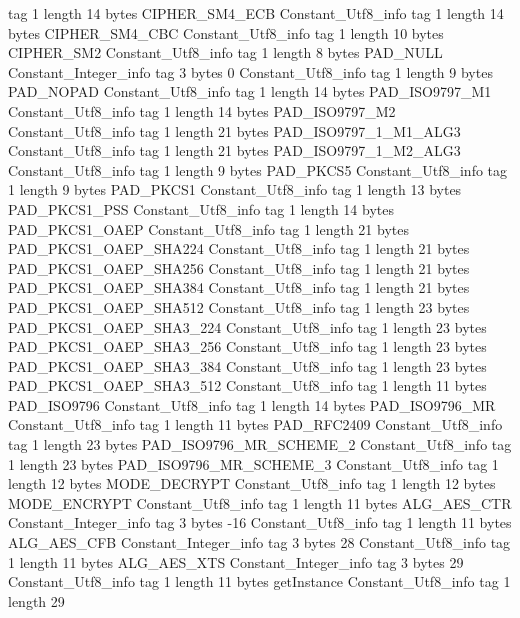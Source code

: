 {{{			tag	1
			length	14
			bytes	CIPHER_SM4_ECB
		}
		Constant_Utf8_info {
			tag	1
			length	14
			bytes	CIPHER_SM4_CBC
		}
		Constant_Utf8_info {
			tag	1
			length	10
			bytes	CIPHER_SM2
		}
		Constant_Utf8_info {
			tag	1
			length	8
			bytes	PAD_NULL
		}
		Constant_Integer_info {
			tag	3
			bytes	0
		}
		Constant_Utf8_info {
			tag	1
			length	9
			bytes	PAD_NOPAD
		}
		Constant_Utf8_info {
			tag	1
			length	14
			bytes	PAD_ISO9797_M1
		}
		Constant_Utf8_info {
			tag	1
			length	14
			bytes	PAD_ISO9797_M2
		}
		Constant_Utf8_info {
			tag	1
			length	21
			bytes	PAD_ISO9797_1_M1_ALG3
		}
		Constant_Utf8_info {
			tag	1
			length	21
			bytes	PAD_ISO9797_1_M2_ALG3
		}
		Constant_Utf8_info {
			tag	1
			length	9
			bytes	PAD_PKCS5
		}
		Constant_Utf8_info {
			tag	1
			length	9
			bytes	PAD_PKCS1
		}
		Constant_Utf8_info {
			tag	1
			length	13
			bytes	PAD_PKCS1_PSS
		}
		Constant_Utf8_info {
			tag	1
			length	14
			bytes	PAD_PKCS1_OAEP
		}
		Constant_Utf8_info {
			tag	1
			length	21
			bytes	PAD_PKCS1_OAEP_SHA224
		}
		Constant_Utf8_info {
			tag	1
			length	21
			bytes	PAD_PKCS1_OAEP_SHA256
		}
		Constant_Utf8_info {
			tag	1
			length	21
			bytes	PAD_PKCS1_OAEP_SHA384
		}
		Constant_Utf8_info {
			tag	1
			length	21
			bytes	PAD_PKCS1_OAEP_SHA512
		}
		Constant_Utf8_info {
			tag	1
			length	23
			bytes	PAD_PKCS1_OAEP_SHA3_224
		}
		Constant_Utf8_info {
			tag	1
			length	23
			bytes	PAD_PKCS1_OAEP_SHA3_256
		}
		Constant_Utf8_info {
			tag	1
			length	23
			bytes	PAD_PKCS1_OAEP_SHA3_384
		}
		Constant_Utf8_info {
			tag	1
			length	23
			bytes	PAD_PKCS1_OAEP_SHA3_512
		}
		Constant_Utf8_info {
			tag	1
			length	11
			bytes	PAD_ISO9796
		}
		Constant_Utf8_info {
			tag	1
			length	14
			bytes	PAD_ISO9796_MR
		}
		Constant_Utf8_info {
			tag	1
			length	11
			bytes	PAD_RFC2409
		}
		Constant_Utf8_info {
			tag	1
			length	23
			bytes	PAD_ISO9796_MR_SCHEME_2
		}
		Constant_Utf8_info {
			tag	1
			length	23
			bytes	PAD_ISO9796_MR_SCHEME_3
		}
		Constant_Utf8_info {
			tag	1
			length	12
			bytes	MODE_DECRYPT
		}
		Constant_Utf8_info {
			tag	1
			length	12
			bytes	MODE_ENCRYPT
		}
		Constant_Utf8_info {
			tag	1
			length	11
			bytes	ALG_AES_CTR
		}
		Constant_Integer_info {
			tag	3
			bytes	-16
		}
		Constant_Utf8_info {
			tag	1
			length	11
			bytes	ALG_AES_CFB
		}
		Constant_Integer_info {
			tag	3
			bytes	28
		}
		Constant_Utf8_info {
			tag	1
			length	11
			bytes	ALG_AES_XTS
		}
		Constant_Integer_info {
			tag	3
			bytes	29
		}
		Constant_Utf8_info {
			tag	1
			length	11
			bytes	getInstance
		}
		Constant_Utf8_info {
			tag	1
			length	29
}}}
